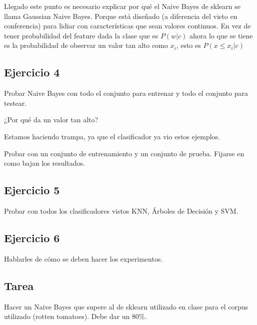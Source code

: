 \documentclass[a4paper,10pt]{article}
\begin{document}
    Llegado este punto es necesario explicar por qué el Naive Bayes
    de sklearn se llama Gaussian Naive Bayes. Porque está diseñado 
    (a diferencia del visto en conferencia) para lidiar con características que 
    sean valores continuos. En vez de tener probabilidad del feature dada la clase
    que es $P(w|c)$ ahora lo que se tiene es la probabilidad de observar 
    un valor tan alto como $x_i$, esto es $P(x \leq x_i| c)$
    
    
   \subsection*{Ejercicio 4}
    
    Probar Naive Bayes con todo el conjunto para entrenar y todo el 
    conjunto para testear.
    
    ¿Por qué da un valor tan alto?
    
    Estamos haciendo trampa, ya que el clasificador ya vio estos ejemplos.
    
    Probar con un conjunto de entrenamiento y un conjunto de prueba.
    Fijarse en como bajan los resultados.
    
  \subsection*{Ejercicio 5}
  	Probar con todos los clasificadores vistos KNN, Árboles de Decisión y SVM. 
    
  \subsection*{Ejercicio 6}
	Hablarles de cómo se deben hacer los experimentos.    
    
  \subsection*{Tarea}
    Hacer un Naive Bayes que supere al de sklearn utilizado en clase para
    el corpus utilizado (rotten tomatoes). Debe dar un 80\%. 
    
\end{document}
